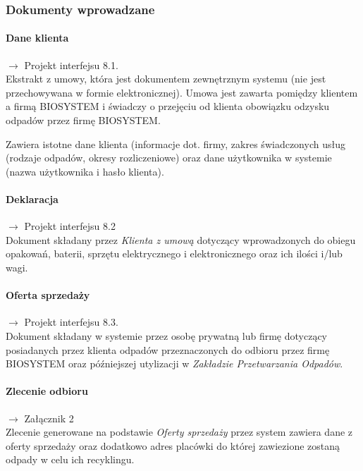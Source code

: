 
\subsubsection{Dokumenty wprowadzane}

	\paragraph{Dane klienta} $\rightarrow$ Projekt interfejsu 8.1. \\
	Ekstrakt z umowy, która jest dokumentem zewnętrznym systemu (nie jest przechowywana w formie elektronicznej).
	Umowa jest zawarta pomiędzy klientem a firmą BIOSYSTEM i świadczy o przejęciu od klienta obowiązku odzysku odpadów przez firmę BIOSYSTEM.

	Zawiera istotne dane klienta (informacje dot. firmy, zakres świadczonych usług (rodzaje odpadów, okresy rozliczeniowe) oraz dane użytkownika w systemie (nazwa użytkownika i hasło klienta).

	\paragraph{Deklaracja} $\rightarrow$ Projekt interfejsu 8.2 \\
	Dokument składany przez \emph{Klienta z umową} dotyczący wprowadzonych do obiegu opakowań, baterii, sprzętu elektrycznego i elektronicznego oraz ich ilości i/lub wagi.

	\paragraph{Oferta sprzedaży} $\rightarrow$ Projekt interfejsu 8.3.\ \\
	Dokument składany w systemie przez osobę prywatną lub firmę dotyczący posiadanych przez klienta odpadów przeznaczonych do odbioru przez firmę BIOSYSTEM oraz późniejszej utylizacji w \emph{Zakładzie Przetwarzania Odpadów}.

	\paragraph{Zlecenie odbioru} $\rightarrow$ Załącznik 2 \\
	Zlecenie generowane na podstawie \emph{Oferty sprzedaży} przez system zawiera dane z oferty sprzedaży oraz dodatkowo adres placówki do której zawiezione zostaną odpady w celu ich recyklingu.

